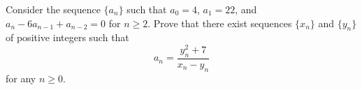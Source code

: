 Consider the sequence $\{a_n\}$ such that $a_0=4$, $a_1=22$, and $a_n-6a_{n-1}+a_{n-2}=0$ for $n\ge2$.  Prove that there exist sequences $\{x_n\}$ and $\{y_n\}$ of positive integers such that
\[
a_n=\frac{y_n^2+7}{x_n-y_n}
\]
for any $n\ge0$.